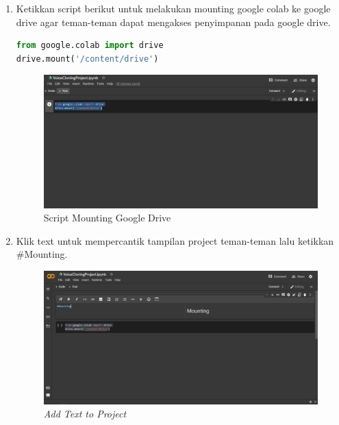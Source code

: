 \begin{enumerate}
\item Ketikkan script berikut untuk melakukan mounting google colab ke google drive agar teman-teman dapat mengakses penyimpanan pada google drive.
\begin{lstlisting}[language=Python, caption=Mounting Google Drive]
from google.colab import drive
drive.mount('/content/drive')
\end{lstlisting}

\begin{figure}[H]
    \centering
    \includegraphics[scale=0.35]{figures/colab3}
    \caption{Script Mounting Google Drive}
    \label{colab3}
\end{figure}

\item Klik text untuk mempercantik tampilan project teman-teman lalu ketikkan \#Mounting.
\begin{figure}[H]
    \centering
    \includegraphics[scale=0.35]{figures/colab4}
    \caption{\textit{Add Text to Project}}
    \label{colab4}
\end{figure}


\end{enumerate}

